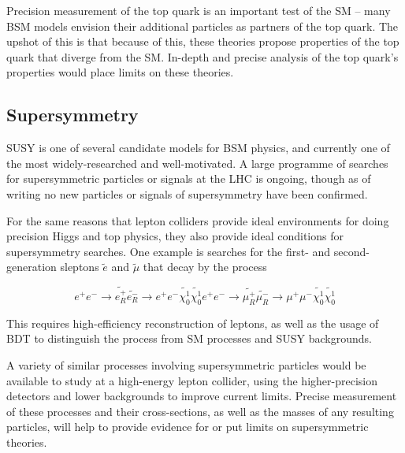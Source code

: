 Precision measurement of the top quark is an important test of the \acrshort{SM} -- many \acrshort{BSM} models envision their additional particles as partners of the top quark. The upshot of this is that because of this, these theories propose properties of the top quark that diverge from the SM. In-depth and precise analysis of the top quark's properties would place limits on these theories.

\subsection{Supersymmetry}
\acrfull{SUSY} is one of several candidate models for \acrshort{BSM} physics, and currently one of the most widely-researched and well-motivated. A large programme of searches for supersymmetric particles or signals at the \acrshort{LHC} is ongoing, though as of writing no new particles or signals of supersymmetry have been confirmed.

For the same reasons that lepton colliders provide ideal environments for doing precision Higgs and top physics, they also provide ideal conditions for supersymmetry searches. One example is searches for the first- and second-generation sleptons $\tilde{e}$ and $\tilde{\mu}$ that decay by the process

$$
e^+ e^- \rightarrow \tilde{e_R^+} \tilde{e_R^-} \rightarrow e^+ e^- \tilde{\chi_0^1} \tilde{\chi_0^1}
e^+ e^- \rightarrow \tilde{\mu_R^+} \tilde{\mu_R^-} \rightarrow \mu^+ \mu^- \tilde{\chi_0^1} \tilde{\chi_0^1}
$$

This requires high-efficiency reconstruction of leptons, as well as the usage of \acrfull{BDT} to distinguish the process from \acrshort{SM} processes and \acrshort{SUSY} backgrounds. 

A variety of similar processes involving supersymmetric particles would be available to study at a high-energy lepton collider, using the higher-precision detectors and lower backgrounds to improve current limits. Precise measurement of these processes and their cross-sections, as well as the masses of any resulting particles, will help to provide evidence for or put limits on supersymmetric theories.

